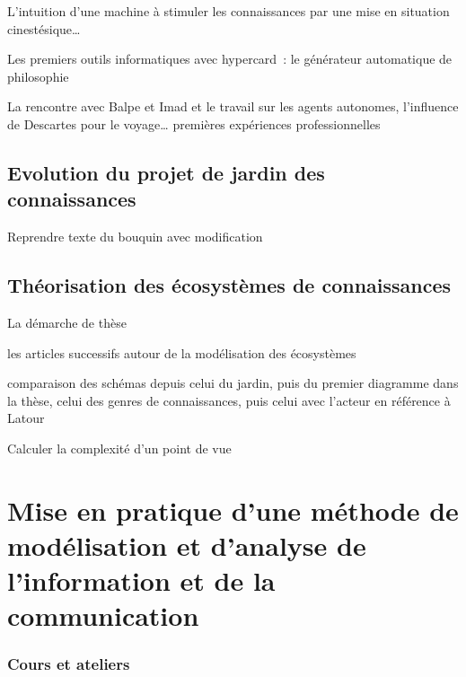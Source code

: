 \documentclass[
  letterpaper,
  DIV=11,
  numbers=noendperiod]{scrreprt}
\begin{document}
L'intuition d'une machine à stimuler les connaissances par une mise en
situation cinestésique\ldots{}

Les premiers outils informatiques avec hypercard~: le générateur
automatique de philosophie

La rencontre avec Balpe et Imad et le travail sur les agents autonomes,
l'influence de Descartes pour le voyage\ldots{} premières expériences
professionnelles

\hypertarget{evolution-du-projet-de-jardin-des-connaissances}{%
\subsection{Evolution du projet de jardin des
connaissances}\label{evolution-du-projet-de-jardin-des-connaissances}}

Reprendre texte du bouquin avec modification

\hypertarget{thuxe9orisation-des-uxe9cosystuxe8mes-de-connaissances}{%
\subsection{Théorisation des écosystèmes de
connaissances}\label{thuxe9orisation-des-uxe9cosystuxe8mes-de-connaissances}}

La démarche de thèse

les articles successifs autour de la modélisation des écosystèmes

comparaison des schémas depuis celui du jardin, puis du premier
diagramme dans la thèse, celui des genres de connaissances, puis celui
avec l'acteur en référence à Latour

Calculer la complexité d'un point de vue

\hypertarget{mise-en-pratique-dune-muxe9thode-de-moduxe9lisation-et-danalyse-de-linformation-et-de-la-communication}{%
\section{Mise en pratique d'une méthode de modélisation et d'analyse de
l'information et de la
communication}\label{mise-en-pratique-dune-muxe9thode-de-moduxe9lisation-et-danalyse-de-linformation-et-de-la-communication}}

\hypertarget{cours-et-ateliers}{%
\subsubsection{Cours et ateliers}\label{cours-et-ateliers}}
\end{document}
